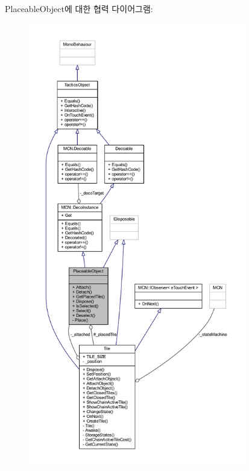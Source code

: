 Placeable\+Object에 대한 협력 다이어그램\+:\nopagebreak
\begin{figure}[H]
\begin{center}
\leavevmode
\includegraphics[height=550pt]{class_placeable_object__coll__graph}
\end{center}
\end{figure}
